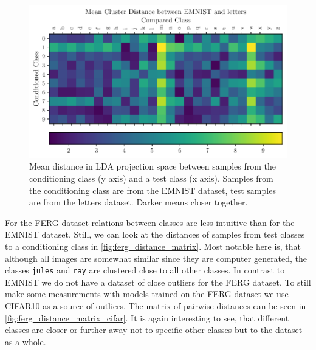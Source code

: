 \begin{figure}[htpb]
	\centering
	\includegraphics{figures/samples/emnist_distance_matrix_letters_lda.pdf}
	\caption{Mean distance in LDA projection space between samples from the
		conditioning class (y axis) and a test class (x axis). Samples
		from the conditioning class are from the EMNIST dataset, test
		samples are from the letters dataset. Darker means closer
		together.}%
	\label{fig:emnist_distance_matrix_letters}
\end{figure}

For the FERG dataset relations between classes are less intuitive than for the
EMNIST dataset. Still, we can look at the distances of samples from test
classes to a conditioning class in \autoref{fig:ferg_distance_matrix}. Most
notable here is, that although all images are somewhat similar since they are
computer generated, the classes \texttt{jules} and \texttt{ray} are clustered
close to all other classes.
In contrast to EMNIST we do not have a dataset of close outliers for the FERG
dataset. To still make some measurements with models trained on the FERG
dataset we use CIFAR10 as a source of outliers. The matrix of pairwise
distances can be seen in \autoref{fig:ferg_distance_matrix_cifar}. It is again
interesting to see, that different classes are closer or further away not to
specific other classes but to the dataset as a whole.

